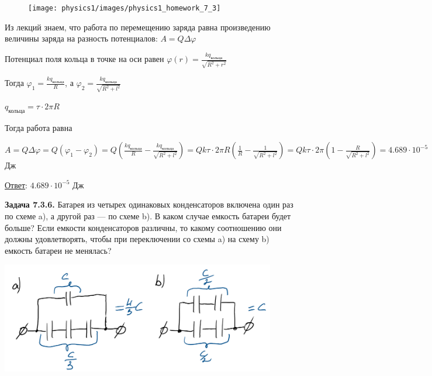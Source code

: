 \documentclass[12pt]{article}
\begin{document}
\begin{minipage}{\textwidth}
    \begin{figure}
        \texttt{[image: physics1/images/physics1\_homework\_7\_3]}
    \end{figure}

    Из лекций знаем, что работа по перемещению заряда равна произведению величины заряда на разность потенциалов: 
    $A = Q\Delta\varphi$

    Потенциал поля кольца в точке на оси равен $\varphi(r) = \frac{kq_{\text{кольца}}}{\sqrt{R^2 + r^2}}$

    Тогда $\varphi_1 = \frac{kq_{\text{кольца}}}{R}$, а $\varphi_2 = \frac{kq_{\text{кольца}}}{\sqrt{R^2 + l^2}}$

    $q_{\text{кольца}} = \tau \cdot 2\pi R$

    Тогда работа равна 
    
    $A = Q\Delta \varphi = Q(\varphi_1 - \varphi_2) = 
    Q\left(\frac{kq_{\text{кольца}}}{R} - \frac{kq_{\text{кольца}}}{\sqrt{R^2 + l^2}}\right) = 
    Qk\tau \cdot 2\pi R \left(\frac{1}{R} - \frac{1}{\sqrt{R^2 + l^2}}\right) = 
    Qk\tau \cdot 2\pi \left(1 - \frac{R}{\sqrt{R^2 + l^2}}\right) = 4.689 \cdot 10^{-5}$ Дж

\end{minipage}

\bigvspace

\underline{Ответ}: $4.689 \cdot 10^{-5}$ Дж








\begin{tcolorbox}
    \textbf{Задача 7.3.6.} Батарея из четырех одинаковых конденсаторов
    включена один раз по схеме a), а другой раз — по схеме b). 
    В каком случае емкость батареи будет больше? Если емкости 
    конденсаторов различны, то какому соотношению они должны 
    удовлетворять, чтобы при переключении со схемы a) на схему
    b) емкость батареи не менялась?
\end{tcolorbox}

\begin{center}
    \includegraphics[width=0.9\textwidth]{physics1/images/physics1_homework_8_1}
\end{center}
\end{document}
